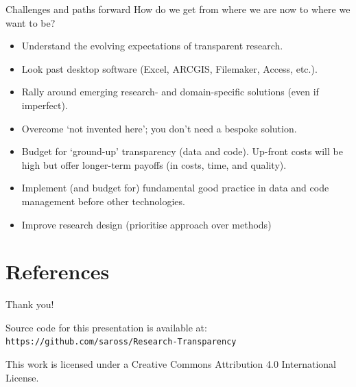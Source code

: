\documentclass[aspectratio=169, 12pt]{beamer} %
\begin{document}
\begin{frame}{Challenges and paths forward}
  How do we get from where we are now to where we want to be?
      \begin{itemize}[label=\textbullet]
        \item Understand the evolving expectations of transparent research. 
        \item Look past desktop software (Excel, ARCGIS, Filemaker, Access, etc.).
        \item Rally around emerging research- and domain-specific solutions (even if imperfect).
        \item Overcome `not invented here'; you don't need a bespoke solution.
        \item Budget for `ground-up' transparency (data and code). Up-front costs will be high but offer longer-term payoffs (in costs, time, and quality).
        \item Implement (and budget for) fundamental good practice in data and code management before other technologies.
        \item Improve research design (prioritise approach over methods) \cite{Muthukrishna2019-kt, Hole1973-cy}
    \end{itemize}
\end{frame}
% 


\section{References}

\begin{multicols}{2}[]


\end{multicols}


  
%   
%   


\begin{frame}{Thank you!}


Source code for this presentation is available at: \texttt{https://github.com/saross/Research-Transparency}

This work is licensed under a Creative Commons Attribution 4.0 International License.

\end{frame}
\end{document}
